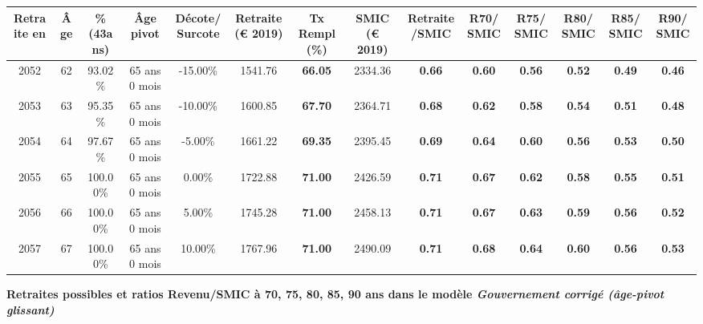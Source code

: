 \begin{adjustbox}{max width=\textwidth} 
\begin{tabular}[htb]{|c|c||c|c|c||c|c||c|c||c|c|c|c|c|} 
\hline 
 Retraite en &  Âge &  \%(43ans) &  Âge pivot &  Décote/Surcote &  Retraite (\euro{} 2019) &  Tx Rempl(\%) &  SMIC (\euro{} 2019) &  Retraite/SMIC &  R70/SMIC &  R75/SMIC &  R80/SMIC &  R85/SMIC &  R90/SMIC \\ 
\hline \hline 
 2052 &  62 &  93.02\% &  65 ans 0 mois &  -15.00\% &  1541.76 &  {\bf 66.05} &  2334.36 &  {\bf {\color{red} 0.66}} &  {\bf {\color{red} 0.60}} &  {\bf {\color{red} 0.56}} &  {\bf {\color{red} 0.52}} &  {\bf {\color{red} 0.49}} &  {\bf {\color{red} 0.46}} \\ 
\hline 
 2053 &  63 &  95.35\% &  65 ans 0 mois &  -10.00\% &  1600.85 &  {\bf 67.70} &  2364.71 &  {\bf {\color{red} 0.68}} &  {\bf {\color{red} 0.62}} &  {\bf {\color{red} 0.58}} &  {\bf {\color{red} 0.54}} &  {\bf {\color{red} 0.51}} &  {\bf {\color{red} 0.48}} \\ 
\hline 
 2054 &  64 &  97.67\% &  65 ans 0 mois &  -5.00\% &  1661.22 &  {\bf 69.35} &  2395.45 &  {\bf {\color{red} 0.69}} &  {\bf {\color{red} 0.64}} &  {\bf {\color{red} 0.60}} &  {\bf {\color{red} 0.56}} &  {\bf {\color{red} 0.53}} &  {\bf {\color{red} 0.50}} \\ 
\hline 
 2055 &  65 &  100.00\% &  65 ans 0 mois &  0.00\% &  1722.88 &  {\bf 71.00} &  2426.59 &  {\bf {\color{red} 0.71}} &  {\bf {\color{red} 0.67}} &  {\bf {\color{red} 0.62}} &  {\bf {\color{red} 0.58}} &  {\bf {\color{red} 0.55}} &  {\bf {\color{red} 0.51}} \\ 
\hline 
 2056 &  66 &  100.00\% &  65 ans 0 mois &  5.00\% &  1745.28 &  {\bf 71.00} &  2458.13 &  {\bf {\color{red} 0.71}} &  {\bf {\color{red} 0.67}} &  {\bf {\color{red} 0.63}} &  {\bf {\color{red} 0.59}} &  {\bf {\color{red} 0.56}} &  {\bf {\color{red} 0.52}} \\ 
\hline 
 2057 &  67 &  100.00\% &  65 ans 0 mois &  10.00\% &  1767.96 &  {\bf 71.00} &  2490.09 &  {\bf {\color{red} 0.71}} &  {\bf {\color{red} 0.68}} &  {\bf {\color{red} 0.64}} &  {\bf {\color{red} 0.60}} &  {\bf {\color{red} 0.56}} &  {\bf {\color{red} 0.53}} \\ 
\hline 
\hline 
\end{tabular} 
\end{adjustbox} 
 
 \vspace{0.1cm} 
{\bf \noindent Retraites possibles et ratios Revenu/SMIC à 70, 75, 80, 85, 90 ans dans le modèle \emph{Gouvernement corrigé (âge-pivot glissant)}}  
 
